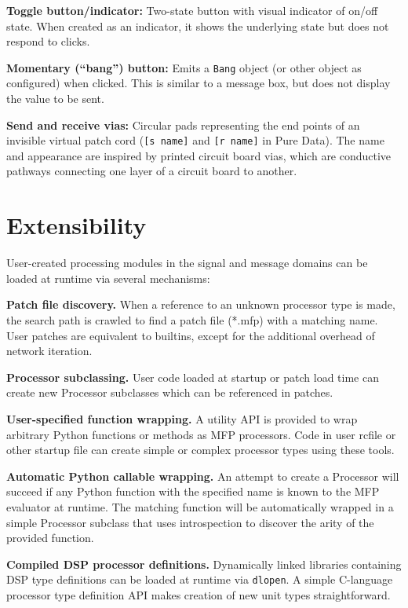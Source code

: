 \documentclass[11pt,a4paper]{article}
\begin{document}
\textbf{Toggle button/indicator:} Two-state button with visual indicator of
on/off state.  When created as an indicator, it shows the underlying state
but does not respond to clicks.

\textbf{Momentary (``bang'') button:} Emits a \texttt{Bang} object (or other object as
configured) when clicked.  This is similar to a message box, but does not
display the value to be sent. 

\textbf{Send and receive vias:}  Circular pads representing the end points
of an invisible virtual patch cord (\texttt{[s name]} and \texttt{[r name]}
in Pure Data).  The name and appearance are inspired by printed circuit
board vias, which are conductive pathways connecting one layer of a circuit
board to another. 

\section{Extensibility} 

User-created processing modules in the signal and message domains can be
loaded at runtime via several mechanisms:

\textbf{Patch file discovery.}  When a reference  to an unknown processor
type is made, the search path is crawled to find a patch file (*.mfp) with
a matching  name.  User patches are equivalent to builtins, except for the
additional overhead of network iteration.  

\textbf{Processor subclassing.}  User code loaded at startup or patch load
time can create new Processor subclasses which can be referenced in
patches.

\textbf{User-specified function wrapping.}  A utility API is provided to
wrap arbitrary Python functions or methods as MFP processors.  Code in user
rcfile or other startup file can create simple or complex processor types
using these tools.

\textbf{Automatic Python callable wrapping.}  An attempt to create a
Processor will succeed if any Python function with the specified name is
known to the MFP evaluator at runtime.  The matching function will be
automatically wrapped in a simple Processor subclass that uses
introspection to discover the arity of the provided function.  

\textbf{Compiled DSP processor definitions.}  Dynamically linked libraries
containing DSP type definitions can be loaded at runtime via
\texttt{dlopen}.  A simple C-language processor type definition API makes
creation of new unit types straightforward.  
\end{document}
